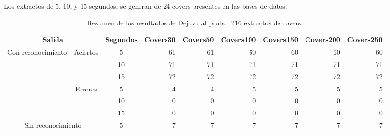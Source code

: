 \begin{sidewaystable}
\centering
\caption{Resumen de los resultados de Dejavu al probar 216 extractos de covers.}{Los extractos de 5, 10, y 15 segundos, se generan de 24 covers presentes en las bases de datos.}
\label{tab:ResumenCovers}
\begin{tabular}{@{}ccc|rrrrrr@{}}
\toprule
\midrule
\multicolumn{2}{c}{Salida}                                         & Segundos & \multicolumn{1}{c}{Covers30} & \multicolumn{1}{c}{Covers50} & \multicolumn{1}{c}{Covers100} & \multicolumn{1}{c}{Covers150} & \multicolumn{1}{c}{Covers200} & \multicolumn{1}{c}{Covers250} \\ \midrule
\multirow{6}{*}{Con reconocimiento}   & \multirow{3}{*}{Aciertos}  & 5        & 61                           & 61                           & 60                            & 60                            & 60                            & 60                            \\
                                      &                            & 10       & 71                           & 71                           & 71                            & 71                            & 71                            & 71                            \\
                                      &                            & 15       & 72                           & 72                           & 72                            & 72                            & 72                            & 72                            \\ \cmidrule{2-9}
                                      & \multirow{3}{*}{Errores}   & 5        & 4                            & 4                            & 5                             & 5                             & 5                             & 5                             \\
                                      &                            & 10       & 0                            & 0                            & 0                             & 0                             & 0                             & 0                             \\
                                      &                            & 15       & 0                            & 0                            & 0                             & 0                             & 0                             & 0                             \\
\midrule
\multicolumn{2}{c}{\multirow{3}{*}{Sin reconocimiento}}            & 5        & 7                            & 7                            & 7                             & 7                             & 7                             & 7                             \\

\end{tabular}
\end{sidewaystable}
